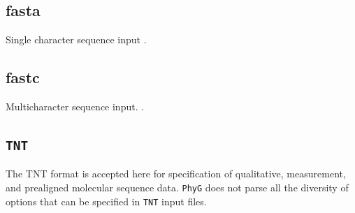 \documentclass[11pt]{book}
\newcommand{\phyg}{\texttt{PhyG} }
\begin{document}
{{		\subsection{fasta}
		Single character sequence input \citep{PearsonandLipman1988}.
		
		\subsection{fastc}
		Multicharacter sequence input. \citep{WheelerandWashburn2019}.
		
		\subsection{\texttt{TNT}}
		The TNT \citep{Goloboffetal2008} format is accepted here for specification of qualitative,
		measurement, and prealigned molecular sequence data. \phyg does not parse all the
		diversity of options that can be specified in \texttt{TNT} input files.\\
		
%	
}}
\end{document}
